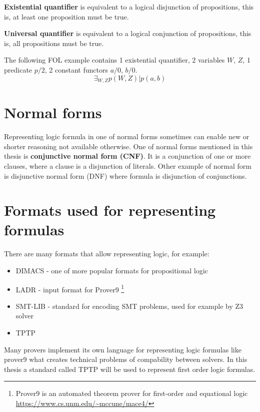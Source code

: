 \textbf{Existential quantifier}
is equivalent to a logical disjunction of propositions, this is, at least one proposition must be true.

\textbf{Universal quantifier}
is equivalent to a logical conjunction of propositions, this is, all propositions must be true.

The following \gls{FOL} example contains 1 existential quantifier, 2 variables $W$, $Z$, 1 predicate $p/2$, 2 constant functors $a/0$, $b/0$.
\begin{equation} \label{eg:FOL_1}
  \exists_{W,Z} p(W,Z) | p(a, b)
\end{equation}

\section{Normal forms}

Representing logic formula in one of normal forms sometimes can enable new or shorter reasoning not available otherwise. One of normal forms mentioned in this thesis is \textbf{conjunctive normal form (CNF)}. It is a conjunction of one or more clauses, where a clause is a disjunction of literals. Other example of normal form is disjunctive normal form (DNF) where formula is disjunction of conjunctions.

\section{Formats used for representing formulas}

There are many formats that allow representing logic, for example:

\begin{itemize}
  \item DIMACS - one of more popular formats for propositional logic 
  \item \gls{LADR} - input format for Prover9 \footnote{Prover9 is an automated theorem prover for first-order and equational logic \url{https://www.cs.unm.edu/~mccune/mace4/}}
  \item SMT-LIB \cite{BarFT-RR-17} - standard for encoding SMT problems, used for example by Z3 solver
  \item \gls{TPTP} 
\end{itemize}

Many provers implement its own language for representing logic formulas like prover9 what creates technical problems of compability between solvers. In this thesis a standard called \gls{TPTP} will be used to represent first order logic formulas.

